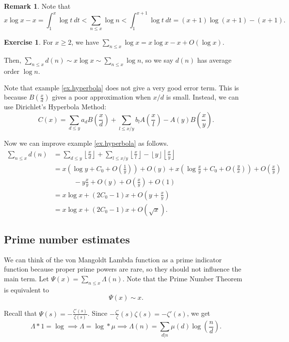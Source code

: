 \documentclass[11pt]{article}
\theoremstyle{definition}
\newtheorem{exe}[thm]{Exercise}
\newtheorem{remark}[thm]{Remark}
\newcommand{\floor}[1]{\left\lfloor #1 \right\rfloor}
\newcommand{\La}[0]{\Lambda}
\begin{document}
\begin{remark}
Note that
\[
x\log x - x = \int_1^x\log t ~dt
< \sum_{n\le x} \log n
< \int_1^{x+1}\log t ~dt
= (x+1)\log(x+1) - (x+1) .
\]
\end{remark}

\begin{exe}
For $x\ge2$, we have $\sum_{n\le x}\log x = x\log x-x+O(\log x)$.
\end{exe}

Then, $\sum_{n\le x}d(n) \sim x\log x \sim \sum_{n\le x}\log n$, so we say $d(n)$ has
average order $\log n$.

Note that example \ref{ex.hyperbola} does not give a very good error term. This is because
$B\left(\frac{x}{d}\right)$ gives a poor approximation when $x/d$ is small. Instead, we can
use Dirichlet's Hyperbola Method:
\begin{equation}
C(x) = \sum_{d\le y} a_d B\left(\frac{x}{d}\right)
+ \sum_{l\le x/y} b_l A\left(\frac{x}{l}\right)
- A(y)B\left(\frac{x}{y}\right) .
\end{equation}

Now we can improve example \ref{ex.hyperbola} as follows.
\begin{align*}
\sum_{n\le x} d(n) &= \sum_{d\le y} \floor{\frac{x}{d}}
+ \sum_{l\le x/y} \floor{\frac{x}{l}}
- \floor{y}\floor{\frac{x}{y}} \\
&= x\left(\log y+C_0+O\left(\frac1y\right)\right) + O(y)
+ x\left(\log\frac{x}{y} + C_0 + O\left(\frac{y}{x}\right)\right)
+ O\left(\frac{x}{y}\right) \\
&\hspace{36pt}- y\frac{x}{y} + O(y) + O\left(\frac{x}{y}\right) + O(1) \\
&= x\log x + (2C_0-1)x + O\left(y+\frac{x}{y}\right) \\
&= x\log x + (2C_0-1)x + O\left(\sqrt x\right) .
\end{align*}

\subsection{Prime number estimates}

We can think of the von Mangoldt Lambda function as a prime indicator function because
proper prime powers are rare, so they should not influence the main term. Let
$\Psi(x)=\sum_{n\le x}\La(n)$. Note that the Prime Number Theorem is equivalent to
\[
\Psi(x)\sim x .
\]

Recall that $\Psi(s)=-\frac{\zeta'(s)}{\zeta(s)}$. Since
$-\frac{\zeta'}{\zeta}(s)\zeta(s)=-\zeta'(s)$, we get
\[
\La*1 = \log \implies \La=\log*\mu
\implies \La(n) = \sum_{d|n}\mu(d)\log\left(\frac{n}{d}\right) .
\]
\end{document}

